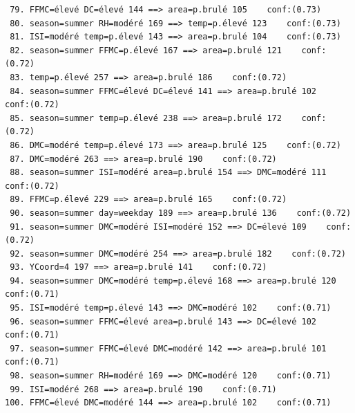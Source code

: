 \documentclass{article}
\begin{document}
\begin{sffamily}
\begin{center}
\begin{verbatim}
 79. FFMC=élevé DC=élevé 144 ==> area=p.brulé 105    conf:(0.73)
 80. season=summer RH=modéré 169 ==> temp=p.élevé 123    conf:(0.73)
 81. ISI=modéré temp=p.élevé 143 ==> area=p.brulé 104    conf:(0.73)
 82. season=summer FFMC=p.élevé 167 ==> area=p.brulé 121    conf:(0.72)
 83. temp=p.élevé 257 ==> area=p.brulé 186    conf:(0.72)
 84. season=summer FFMC=élevé DC=élevé 141 ==> area=p.brulé 102    conf:(0.72)
 85. season=summer temp=p.élevé 238 ==> area=p.brulé 172    conf:(0.72)
 86. DMC=modéré temp=p.élevé 173 ==> area=p.brulé 125    conf:(0.72)
 87. DMC=modéré 263 ==> area=p.brulé 190    conf:(0.72)
 88. season=summer ISI=modéré area=p.brulé 154 ==> DMC=modéré 111    conf:(0.72)
 89. FFMC=p.élevé 229 ==> area=p.brulé 165    conf:(0.72)
 90. season=summer day=weekday 189 ==> area=p.brulé 136    conf:(0.72)
 91. season=summer DMC=modéré ISI=modéré 152 ==> DC=élevé 109    conf:(0.72)
 92. season=summer DMC=modéré 254 ==> area=p.brulé 182    conf:(0.72)
 93. YCoord=4 197 ==> area=p.brulé 141    conf:(0.72)
 94. season=summer DMC=modéré temp=p.élevé 168 ==> area=p.brulé 120    conf:(0.71)
 95. ISI=modéré temp=p.élevé 143 ==> DMC=modéré 102    conf:(0.71)
 96. season=summer FFMC=élevé area=p.brulé 143 ==> DC=élevé 102    conf:(0.71)
 97. season=summer FFMC=élevé DMC=modéré 142 ==> area=p.brulé 101    conf:(0.71)
 98. season=summer RH=modéré 169 ==> DMC=modéré 120    conf:(0.71)
 99. ISI=modéré 268 ==> area=p.brulé 190    conf:(0.71)
100. FFMC=élevé DMC=modéré 144 ==> area=p.brulé 102    conf:(0.71)
	\end{verbatim}
\end{center}

\end{sffamily}
\end{document}

